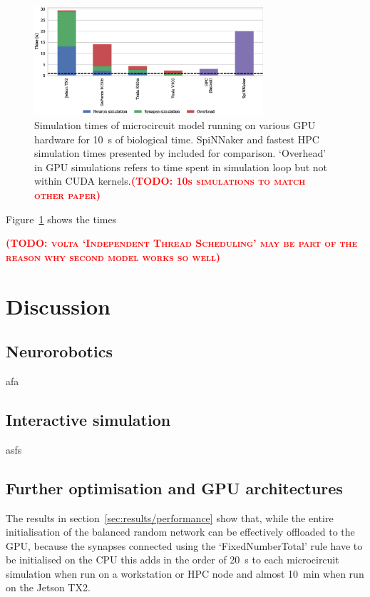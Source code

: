 \documentclass[utf8]{frontiersSCNS} %
\newcommand{\todo}[1]{\textbf{\textsc{\textcolor{red}{(TODO: #1)}}}}
\begin{document}
\begin{figure}
    \begin{center}
        \includegraphics[width=85mm]{figures/microcircuit_performance}
    \end{center}
    \caption{Simulation times of microcircuit model running on various GPU hardware for \SI{10}{\second} of biological time.
    SpiNNaker and fastest HPC simulation times presented by \citet{VanAlbada2018} included for comparison.
    `Overhead' in GPU simulations refers to time spent in simulation loop but not within CUDA kernels.\todo{10s simulations to match other paper}}
    \label{fig:microcircuit_performance}
\end{figure}

Figure~\ref{fig:microcircuit_performance} shows the times 

\todo{volta `Independent Thread Scheduling' may be part of the reason why second model works so well}

\section{Discussion}

\subsection{Neurorobotics}
afa

\subsection{Interactive simulation}
asfs

\subsection{Further optimisation and GPU architectures}
The results in section~\ref{sec:results/performance} show that, while the entire initialisation of the balanced random network can be effectively offloaded to the GPU, because the synapses connected using the `FixedNumberTotal' rule have to be initialised on the CPU this adds in the order of \SI{20}{\second} to each microcircuit simulation when run on a workstation or HPC node and almost \SI{10}{\minute} when run on the Jetson TX2.
\end{document}
